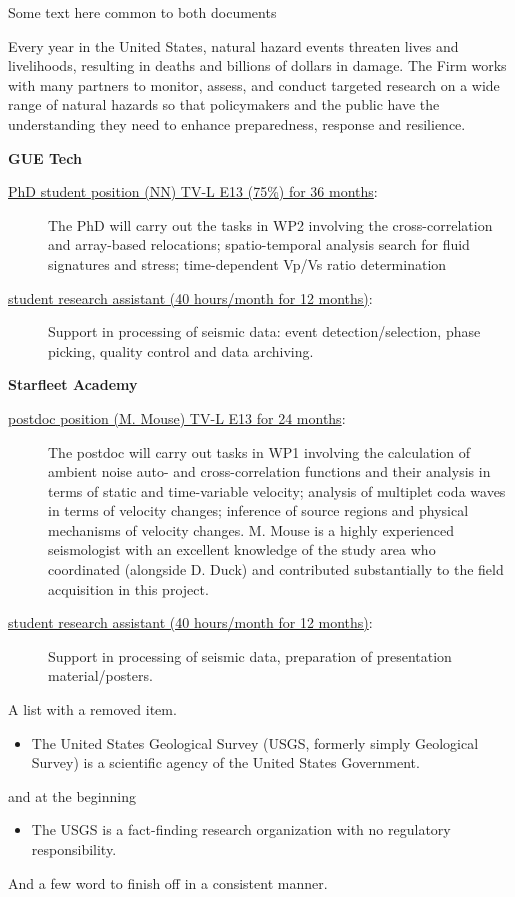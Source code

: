 \documentclass{article}
\begin{document}
Some text here common to both documents

Every year in the United States, natural hazard events threaten lives and livelihoods, resulting in deaths and billions of dollars in damage. The Firm works with many partners to monitor, assess, and conduct targeted research on a wide range of natural hazards so that policymakers and the public have the understanding they need to enhance preparedness, response and resilience.


\textbf{GUE Tech}
\begin{description}
\item[\underline{ PhD student position (NN) TV-L E13 (75\%) for 36 months}:] 
The PhD will carry out the tasks in WP2 involving the cross-correlation and array-based relocations;  spatio-temporal analysis search for fluid signatures and stress; time-dependent Vp/Vs ratio determination  
\item[\underline{ student research assistant (40 hours/month for 12 months)}:] Support in processing of seismic data: event detection/selection, phase picking, quality control and data archiving.
\end{description}
\textbf{Starfleet Academy} %
\begin{description}\item[\underline{ postdoc position (M. Mouse) TV-L E13 for 24 months}:] 
The postdoc will carry out tasks in WP1 involving the calculation of ambient noise auto- and cross-correlation functions and their analysis in terms of static and time-variable velocity; analysis of multiplet coda waves in terms of velocity changes; inference of source regions and physical mechanisms of velocity changes. M. Mouse is a highly experienced seismologist with an excellent knowledge of the study area who coordinated (alongside D. Duck) and contributed substantially to the field acquisition in this project.  
\item[\underline{ student research assistant (40 hours/month for 12 months)}:] Support in processing of seismic data, preparation of presentation material/posters.
\end{description}
%

A list with a removed item.
\begin{itemize}
\item The United States Geological Survey (USGS, formerly simply Geological Survey) is a scientific agency of the United States Government. 
\end{itemize}
and at the beginning
\begin{itemize}
\item The USGS is a fact-finding research organization with no regulatory responsibility.
\end{itemize}

And a few word to finish off in a consistent manner.
\end{document}
